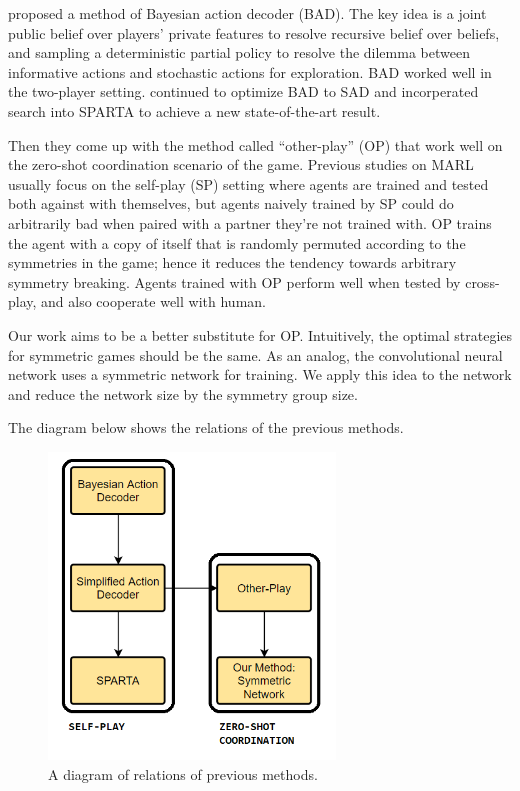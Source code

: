 \documentclass[12pt]{article}
\begin{document}
\begin{spacing}{1.15}
\cite{foerster2018bayesian} proposed a method of Bayesian action decoder (BAD). The key idea is a joint public belief over players' private features to resolve recursive belief over beliefs, and sampling a deterministic partial policy to resolve the dilemma between informative actions and stochastic actions for exploration. BAD worked well in the two-player setting. \cite{hu2020simplified} continued to optimize BAD to SAD and incorperated search into SPARTA \citep{lerer2020improving} to achieve a new state-of-the-art result.

Then they come up with the method called ``other-play'' (OP) \citep{hu2020other} that work well on the zero-shot coordination scenario of the game. Previous studies on MARL usually focus on the self-play (SP) setting where agents are trained and tested both against with themselves, but agents naively trained by SP could do arbitrarily bad when paired with a partner they’re not trained with. OP trains the agent with a copy of itself that is randomly permuted according to the symmetries in the game; hence it reduces the tendency towards arbitrary symmetry breaking. Agents trained with OP perform well when tested by cross-play, and also cooperate well with human.

Our work aims to be a better substitute for OP. Intuitively, the optimal strategies for symmetric games should be the same. As an analog, the convolutional neural network uses a symmetric network for training. We apply this idea to the network and reduce the network size by the symmetry group size.

The diagram below shows the relations of the previous methods.

\begin{figure}[H]
\centerline{\includegraphics[width=3in]{fig3.png}}
\caption{A diagram of relations of previous methods.}
\label{Fig3}
\end{figure}


\end{spacing}
\end{document}
